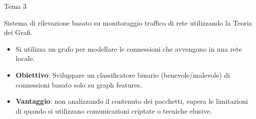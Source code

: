 
\begin{frame}{Tema 3}

  Sistema di rilevazione basato su monitoraggio traffico di rete utilizzando la Teoria dei Grafi.
    \begin{itemize}
      \item Si utilizza un grafo per modellare le connessioni che avvengono in una rete locale.
      \item \textbf{Obiettivo}: Sviluppare un classificatore binario (benevole/malevole) di connessioni basato solo su graph features.
      \item \textbf{Vantaggio}: non analizzando il contenuto dei pacchetti, supera le limitazioni di quando si utilizzano comunicazioni criptate o tecniche elusive.
    \end{itemize}
  
  \end{frame}
  
